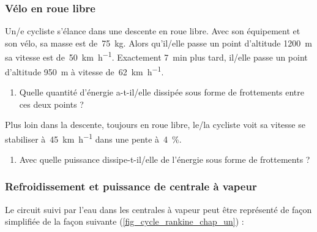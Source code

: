 
\subsubsection{Vélo en roue libre}
\label{exo_velo_roue_libre}
	
	Un/e cycliste s’élance dans une descente en roue libre. Avec son équipement et son vélo, sa masse est de~\SI{75}{\kilogram}. Alors qu’il/elle passe un point d’altitude \SI{1200}{\metre} sa vitesse est de~\SI[per-mode = symbol]{50}{\kilo\metre\per\hour}. Exactement \SI{7}{\minute} plus tard, il/elle passe un point d’altitude \SI{950}{\metre} à vitesse de~\SI[per-mode=symbol]{62}{\kilo\metre\per\hour}.
	
	\begin{enumerate}
		\item Quelle quantité d’énergie a-t-il/elle dissipée sous forme de frottements entre ces deux points ?
	\end{enumerate}
	
	Plus loin dans la descente, toujours en roue libre, le/la cycliste voit sa vitesse se stabiliser à~\SI{45}{\kilo\metre\per\hour} dans une pente à~\SI{4}{\percent}.
	
	\begin{enumerate}
		\item Avec quelle puissance dissipe-t-il/elle de l’énergie sous forme de frottements ?
	\end{enumerate}


\subsubsection{Refroidissement et puissance de centrale à vapeur}
\label{exo_refroidissement_centrale_vapeur}

	Le circuit suivi par l’eau dans les centrales à vapeur peut être représenté de façon simplifiée de la façon suivante (\cref{fig_cycle_rankine_chap_un}) :
	
